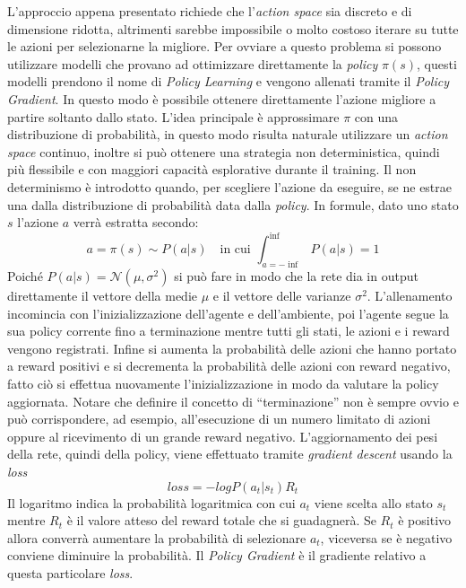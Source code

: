 L'approccio appena presentato richiede che l'\emph{action space} sia discreto e di dimensione ridotta, altrimenti sarebbe impossibile o molto costoso iterare su tutte le azioni per selezionarne la migliore.
Per ovviare a questo problema si possono utilizzare modelli che provano ad ottimizzare direttamente la \emph{policy} $\pi(s)$, questi modelli prendono il nome di \emph{Policy Learning} e vengono allenati tramite il \emph{Policy Gradient}. %
In questo modo è possibile ottenere direttamente l'azione migliore a partire soltanto dallo stato.
L'idea principale è approssimare $\pi$ con una distribuzione di probabilità, in questo modo risulta naturale utilizzare un \emph{action space} continuo, inoltre si può ottenere una strategia non deterministica, quindi più flessibile e con maggiori capacità esplorative durante il training.
Il non determinismo è introdotto quando, per scegliere l'azione da eseguire, se ne estrae una dalla distribuzione di probabilità data dalla \emph{policy}.
In formule, dato uno stato $s$ l'azione $a$ verrà estratta secondo:
$$
a = 
\pi(s) \sim P(a|s) \quad\textrm{in cui } \int_{a = - \inf}^{\inf} P(a | s) = 1
$$
Poiché $P(a|s)  = \mathcal{N}(\mu,\sigma ^2)$ si può fare in modo che la rete dia in output direttamente il vettore della medie $\mu$ e il vettore delle varianze $\sigma^2$.
L'allenamento incomincia con l'inizializzazione dell'agente e dell'ambiente, poi l'agente segue la sua policy corrente fino a terminazione mentre tutti gli stati, le azioni e i reward vengono registrati.
Infine si aumenta la probabilità delle azioni che hanno portato a reward positivi e si decrementa la probabilità delle azioni con reward negativo, fatto ciò si effettua nuovamente l'inizializzazione in modo da valutare la policy aggiornata. 
Notare che definire il concetto di ``terminazione'' non è sempre ovvio e può corrispondere, ad esempio, all'esecuzione di un numero limitato di azioni oppure al ricevimento di un grande reward negativo.
L'aggiornamento dei pesi della rete, quindi della policy, viene effettuato tramite \emph{gradient descent} usando la \emph{loss}
$$
loss = - log P(a_t | s_t ) R_t
$$
Il logaritmo indica la probabilità logaritmica con cui $a_t$ viene scelta allo stato $s_t$ mentre $R_t$ è il valore atteso del reward totale che si guadagnerà.
Se $R_t$ è positivo allora converrà aumentare la probabilità di selezionare $a_t$, viceversa se è negativo conviene diminuire la probabilità.
Il \emph{Policy Gradient} è il gradiente relativo a questa particolare \emph{loss}.


\clearpage

